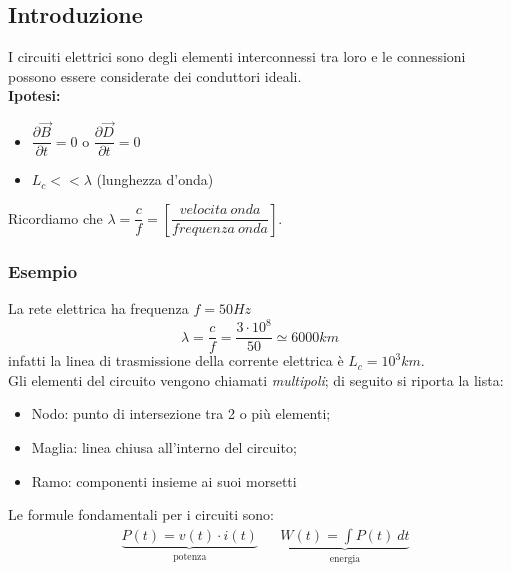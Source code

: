 \documentclass{article}
\begin{document}
\subsection{Introduzione}
I circuiti elettrici sono degli elementi interconnessi tra loro e le connessioni possono essere considerate dei conduttori ideali.
\vspace*{0.2cm}\\
\textbf{Ipotesi:}
\begin{itemize}
    \item $ \dfrac{\partial \vec B}{\partial t} = 0 $ o $ \dfrac{\partial \vec D}{\partial t} = 0 $
    \item $L_c << \lambda$ (lunghezza d'onda)
\end{itemize}
Ricordiamo che $\lambda = \dfrac{c}{f} = \left[ \dfrac{velocita \ onda}{frequenza \ onda} \right]$.
\subsubsection*{Esempio}
La rete elettrica ha frequenza $f = 50 Hz$
\[
    \lambda = \dfrac{c}{f} = \dfrac{3 \cdot 10^{8}}{50} \simeq 6000 km
\]
infatti la linea di trasmissione della corrente elettrica è $L_c = 10^3 km$.
\vspace*{0.2cm}\\
Gli elementi del circuito vengono chiamati \textit{multipoli}; di seguito si riporta la lista:
\begin{itemize}
    \item Nodo: punto di intersezione tra 2 o più elementi;
    \item Maglia: linea chiusa all'interno del circuito;
    \item Ramo: componenti insieme ai suoi morsetti
\end{itemize}
Le formule fondamentali per i circuiti sono:
\begin{align*}
    &\underbrace{P(t) = v(t) \cdot i(t)}_{\text{potenza}} & &\underbrace{W(t) = \int P(t) \ dt}_{\text{energia}}
\end{align*}
\end{document}
